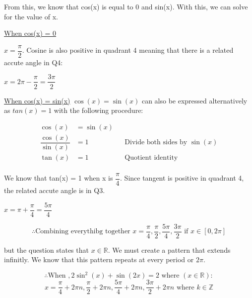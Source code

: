 \documentclass[12pt]{book}
\begin{document}
\begin{enumerate}
From this, we know that cos(x) is equal to 0 and sin(x). With this, we can solve for the value of x.

\vspace{0.3cm}
\underline{When cos(x) = 0}

\vspace{0.1cm}
$x = \boxed{\dfrac{\pi}{2}}$. Cosine is also positive in quadrant 4 meaning that there is a 
related accute angle in Q4:

$x = 2\pi - \dfrac{\pi}{2} = \boxed{\dfrac{3\pi}{2}}$

\vspace{0.3cm}
\underline{When cos(x) = sin(x)}
$\cos(x) = \sin(x)$ can also be expressed alternatively as $tan(x) = 1$ with the following procedure:

\begin{align*}
    \cos(x) &= \sin(x) \\
    \dfrac{\cos(x)}{\sin(x)} &= 1 && \text{Divide both sides by } \sin(x) \\
    \tan(x) &= 1 && \text{Quotient identity} \\ 
\end{align*}

We know that tan(x) = 1 when x is $\boxed{\dfrac{\pi}{4}}$. Since tangent is positive in 
quadrant 4, the related accute angle is in Q3. 

$x = \pi + \dfrac{\pi}{4} = \boxed{\dfrac{5\pi}{4}}$

\newpage

$$\therefore \text{Combining everythibg together }x = \dfrac{\pi}{4}, \dfrac{\pi}{2}, \dfrac{5\pi}{4} , \dfrac{3\pi}{2} \text{ if } x \in [0, 2\pi]$$

but the question states that $x \in \mathbb{R}$. We must create a pattern that extends 
infinitly. We know that this pattern repeats at every period or $2\pi$.

$$\therefore \text{When }, 2\sin^2(x) + \sin(2x) = 2 \text{ where }(x \in \mathbb{R}):$$
$$\boxed{x = \dfrac{\pi}{4} + 2\pi n, \dfrac{\pi}{2} + 2\pi n, \dfrac{5\pi}{4} + 2\pi n , \dfrac{3\pi}{2} + 2\pi n \text{ where } k \in \mathbb{Z}}$$

\vspace{0.1cm}


\newpage


\end{enumerate}
\end{document}

